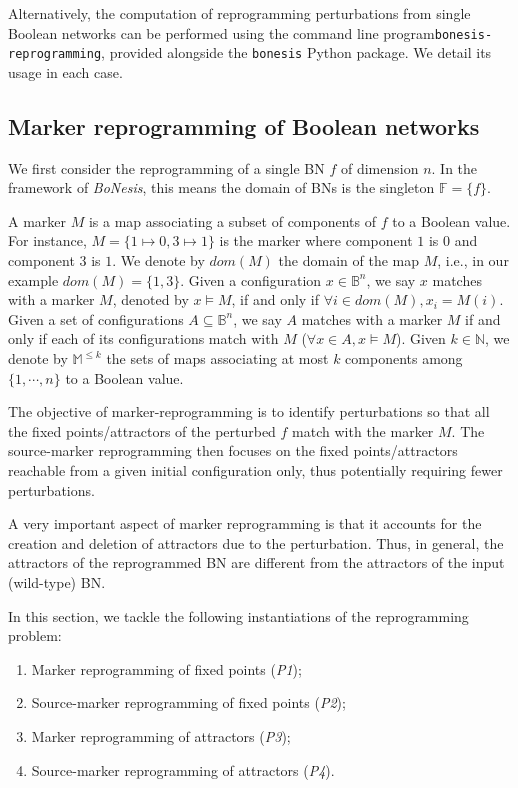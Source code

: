 \documentclass[PCJ,Unicode,screen,mode=plain]{cedram}
\begin{document}
\medskip

Alternatively, the computation of reprogramming perturbations from
single Boolean networks can be performed using the command line
program\texttt{bonesis-reprogramming}, provided alongside the
\texttt{bonesis} Python package. We detail its usage in each case.
\hypertarget{marker-reprogramming-of-boolean-networks}{%
\subsection{Marker reprogramming of Boolean
networks}\label{marker-reprogramming-of-boolean-networks}}

We first consider the reprogramming of a single BN \(f\) of dimension
\(n\). In the framework of \emph{BoNesis}, this means the domain of BNs
is the singleton \(\mathbb F = \{ f \}\).

A marker \(M\) is a map associating a subset of components of \(f\) to a
Boolean value. For instance, \(M = \{ 1\mapsto 0, 3\mapsto 1\}\) is the
marker where component \(1\) is \(0\) and component \(3\) is \(1\). We
denote by \(dom(M)\) the domain of the map \(M\), i.e., in our example
\(dom(M) = \{ 1, 3\}\). Given a configuration \(x\in \mathbb B^n\), we
say \(x\) matches with a marker \(M\), denoted by \(x\models M\), if and
only if \(\forall i\in dom(M), x_i=M(i)\). Given a set of configurations
\(A\subseteq \mathbb B^n\), we say \(A\) matches with a marker \(M\) if
and only if each of its configurations match with \(M\)
(\(\forall x\in A, x\models M\)). Given \(k\in\mathbb N\), we denote by
\(\mathbb M^{\leq k}\) the sets of maps associating at most \(k\)
components among \(\{1, \cdots, n\}\) to a Boolean value.

The objective of marker-reprogramming is to identify perturbations so
that all the fixed points/attractors of the perturbed \(f\) match with
the marker \(M\). The source-marker reprogramming then focuses on the
fixed points/attractors reachable from a given initial configuration
only, thus potentially requiring fewer perturbations.

A very important aspect of marker reprogramming is that it accounts for
the creation and deletion of attractors due to the perturbation. Thus,
in general, the attractors of the reprogrammed BN are different from the
attractors of the input (wild-type) BN.

In this section, we tackle the following instantiations of the
reprogramming problem:

\begin{enumerate}
\def\labelenumi{\arabic{enumi}.}
\item
  Marker reprogramming of fixed points (\emph{P1});
\item
  Source-marker reprogramming of fixed points (\emph{P2});
\item
  Marker reprogramming of attractors (\emph{P3});
\item
  Source-marker reprogramming of attractors (\emph{P4}).
\end{enumerate}
\end{document}
